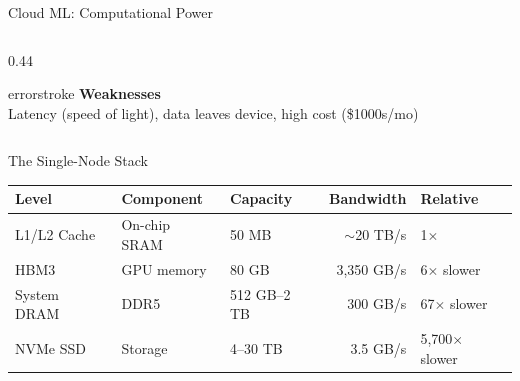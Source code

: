 \documentclass[aspectratio=169, 12pt]{beamer}
\begin{document}
\begin{frame}{Cloud ML: Computational Power}
\begin{columns}[T]
\begin{column}{0.44\textwidth}
    \vspace{0.15cm}
    \begin{mlsyscard}{errorstroke}
    \textbf{Weaknesses}\\
    {\footnotesize Latency (speed of light), data leaves device, high cost (\$1000s/mo)}
    \end{mlsyscard}
  \end{column}
\end{columns}

\end{frame}

\begin{frame}{The Single-Node Stack}
\note{
%
%
%
%
%
}

\scriptsize
\renewcommand{\arraystretch}{1.05}
\begin{tabular}{@{}lllrl@{}}
  \toprule
  \textbf{Level} & \textbf{Component} & \textbf{Capacity} & \textbf{Bandwidth} & \textbf{Relative} \\
  \midrule
  L1/L2 Cache & On-chip SRAM & 50 MB & $\sim$20 TB/s & 1$\times$ \\
  \textcolor{computestroke}{HBM3} & GPU memory & 80 GB & 3,350 GB/s & 6$\times$ slower \\
  \textcolor{datastroke}{System DRAM} & DDR5 & 512 GB--2 TB & 300 GB/s & 67$\times$ slower \\
  \textcolor{routingstroke}{NVMe SSD} & Storage & 4--30 TB & 3.5 GB/s & 5,700$\times$ slower \\
  \bottomrule
\end{tabular}


\end{frame}
\end{document}
